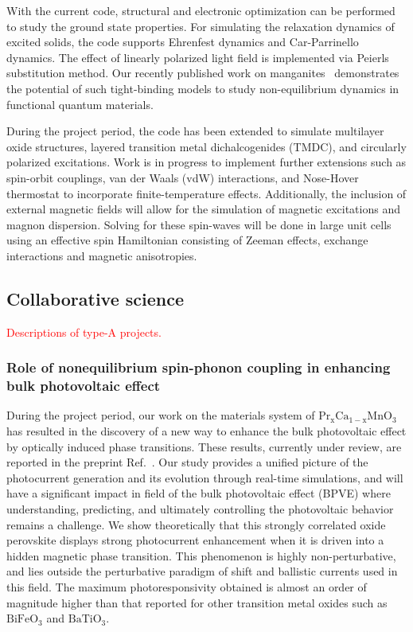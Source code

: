 With the current code, structural and electronic optimization
can be performed to study the ground state properties. 
For simulating the relaxation dynamics of excited solids, 
the code supports Ehrenfest dynamics and Car-Parrinello dynamics. 
The effect of linearly polarized light field is implemented 
via Peierls substitution method. Our recently published work
on manganites~\cite{Sangeeta2020a} demonstrates the potential of such tight-binding
models to study non-equilibrium dynamics in functional quantum materials. 

During the project period, the code has been extended to simulate multilayer
oxide structures, layered transition metal dichalcogenides (TMDC), and circularly polarized excitations. 
Work is in progress to implement further extensions such as spin-orbit couplings,  van der Waals (vdW) interactions, and Nose-Hover thermostat to incorporate finite-temperature effects. Additionally, the inclusion of external magnetic fields will allow for the simulation of magnetic
excitations and magnon dispersion. Solving for these spin-waves will be done in large unit cells using
an effective spin Hamiltonian consisting of Zeeman effects, exchange interactions and magnetic
anisotropies. 



\subsection{Collaborative science}
\textcolor{red}{Descriptions of type-A projects.}

\subsubsection{Role of nonequilibrium spin-phonon coupling in enhancing bulk photovoltaic effect }\label{sec:BPVE}
During the project period, our work on the materials system of \(\mathrm{Pr_xCa_{1-x}MnO_3}\) has resulted in the discovery of a new way to enhance the bulk photovoltaic effect by optically induced phase transitions. 
These results, currently under review, are reported in the preprint Ref.~\cite{Rajpurohit2021}. 
Our study provides a unified picture of the photocurrent generation and its evolution through real-time simulations, and will have a significant impact in field of the bulk photovoltaic effect (BPVE) where understanding, predicting, and ultimately controlling the photovoltaic behavior remains a challenge.
We show theoretically that this strongly correlated oxide perovskite displays strong photocurrent enhancement when it is driven into a hidden magnetic phase transition.
This phenomenon is highly non-perturbative, and lies outside the perturbative paradigm of shift and ballistic currents used in this field. 
The maximum photoresponsivity obtained is almost an order of magnitude higher than that reported for other transition metal oxides such as \(\mathrm{BiFeO_3}\) and \(\mathrm{BaTiO_3}\).

